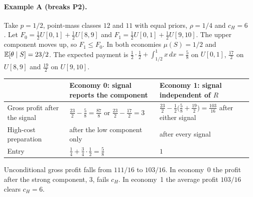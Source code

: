 \paragraph{Example A (breaks P2).} Take \(p=1/2\), point-mass
classes \(12\) and \(11\) with equal priors, \(\rho=1/4\) and \(c_H=6\). Let
\(F_0=\tfrac12U[0,1]+\tfrac12U[8,9]\) and \(F_1=\tfrac12U[0,1]+\tfrac12U[9,10]\). The upper component moves up, so
\(F_1\le F_0\). In both economies \(\mu(S)=1/2\) and \(\mathbb{E}[\theta\mid S]=23/2\). The expected payment is
\(\tfrac12\cdot\tfrac12+\int_{1/2}^1x\,dx=\tfrac58\) on \(U[0,1]\), \(\tfrac{17}2\) on \(U[8,9]\) and \(\tfrac{19}2\) on
\(U[9,10]\).
\begin{center}\small
\begin{tabularx}{\linewidth}{@{}lXX@{}}
\toprule
 & Economy 0: signal reports the component & Economy 1: signal independent of \(R\)\\
\midrule
Gross profit after the signal & \(\tfrac{23}2-\tfrac58=\tfrac{87}8\) or \(\tfrac{23}2-\tfrac{17}2=3\) &
\(\tfrac{23}2-\tfrac12\bigl(\tfrac58+\tfrac{19}2\bigr)=\tfrac{103}{16}\) after either signal\\
High-cost preparation & after the low component only & after every signal\\
Entry & \(\tfrac14+\tfrac34\cdot\tfrac12=\tfrac58\) & \(1\)\\
\bottomrule
\end{tabularx}
\end{center}
Unconditional gross profit falls from \(111/16\) to \(103/16\). In economy~0 the profit after the strong component,
\(3\), fails \(c_H\). In economy~1 the average profit \(103/16\) clears \(c_H=6\).

